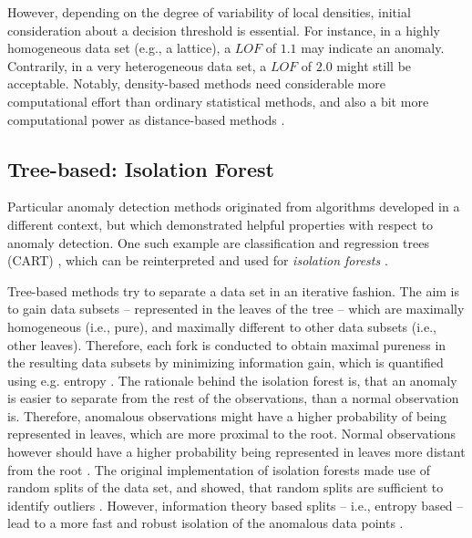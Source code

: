 \documentclass[conference]{IEEEtran}
\begin{document}
However, depending on the degree of variability of local densities, initial consideration about a decision threshold is essential. For instance, in a highly homogeneous data set (e.g., a lattice), a $LOF$ of $1.1$ may indicate an anomaly. Contrarily, in a very heterogeneous data set, a $LOF$ of $2.0$ might still be acceptable. Notably, density-based methods need considerable more computational effort than ordinary statistical  methods, and also a bit more computational power as distance-based methods \cite{ma2016density}.

\subsection{Tree-based: Isolation Forest} \label{sec:iforests}

Particular anomaly detection methods originated from algorithms developed in a different context, but which demonstrated helpful properties with respect to anomaly detection. One such example are classification and regression trees (CART) \cite{loh2011classification}, which can be reinterpreted and used for \emph{isolation forests} \cite{liu2008isolation}.

Tree-based methods try to separate a data set in an iterative fashion.
The aim is to gain data subsets -- represented in the leaves of the tree -- which are maximally homogeneous (i.e., pure), and maximally different to other data subsets (i.e., other leaves). Therefore, each fork is conducted to obtain maximal pureness in the resulting data subsets by minimizing information gain, which is quantified using e.g. entropy \cite{loh2011classification}. The rationale behind the isolation forest is, that an anomaly is easier to separate from the rest of the observations, than a normal observation is. Therefore, anomalous observations might have a higher probability of being represented in leaves, which are more proximal to the root. Normal observations however should have a higher probability being represented in leaves more distant from the root \cite{liu2008isolation}. The original implementation of isolation forests made use of random splits of the data set, and showed, that random splits are sufficient to identify outliers \cite{liu2008isolation}. However, information theory based splits -- i.e., entropy based -- lead to a more fast and robust isolation of the anomalous data points \cite{liao2018entropy}.
\end{document}
